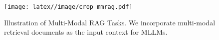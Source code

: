 \begin{figure}[t]
    \centering
    \texttt{[image: latex//image/crop\_mmrag.pdf]}
    \caption{Illustration of Multi-Modal RAG Tasks. We incorporate multi-modal retrieval documents as the input context for MLLMs.}
    \label{fig:mmrag}
\end{figure}